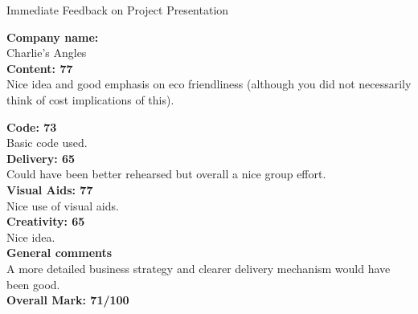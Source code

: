 \documentclass{article}
\begin{document}
\begin{center}
\Huge{Immediate Feedback on Project Presentation}\\
\end{center}


\normalsize
\textbf{Company name:}\\

Charlie's Angles \\

\textbf{Content: 77}\\

Nice idea and good emphasis on eco friendliness (although you did not necessarily think of cost implications of this).

\textbf{Code: 73}\\

Basic code used.\\

\textbf{Delivery: 65}\\

Could have been better rehearsed but overall a nice group effort.\\

\textbf{Visual Aids: 77}\\

Nice use of visual aids.\\

\textbf{Creativity: 65}\\

Nice idea.\\

\textbf{General comments}\\

A more detailed business strategy and clearer delivery mechanism would have been good.\\

\textbf{Overall Mark: 71/100}
\end{document}
